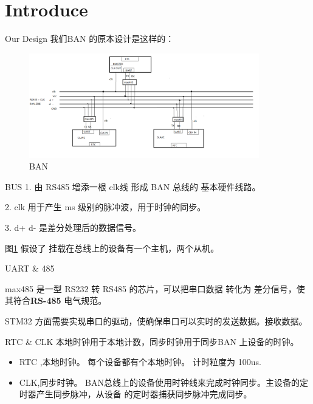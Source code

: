 \section{Introduce}

\begin{frame}[fragile]{Our Design}
我们BAN 的原本设计是这样的：
\begin{figure}[htbp]
\begin{center}
\includegraphics[width=10cm]{img/overview}
\caption{BAN }
\label{Overview}
\end{center}
\vspace{-0.5em}
\end{figure}
\end{frame}


\begin{frame}[fragile]{BUS}
1. 由 RS485 增添一根 clk线 形成 BAN 总线的 基本硬件线路。

2. clk 用于产生 ms 级别的脉冲波，用于时钟的同步。

3.  d+ d- 是差分处理后的数据信号。

图\ref{Overview} 假设了 挂载在总线上的设备有一个主机，两个从机。

\end{frame}

\begin{frame}[fragile]{UART \& 485}

max485 是一型 RS232 转 RS485 的芯片，可以把串口数据 转化为 差分信号，使其符合\textbf{RS-485}
电气规范。

STM32 方面需要实现串口的驱动，使确保串口可以实时的发送数据。接收数据。

\end{frame}

\begin{frame}[fragile]{RTC \& CLK}
本地时钟用于本地计数，同步时钟用于同步BAN 上设备的时钟。
\begin{itemize}
\item  RTC ,本地时钟。 每个设备都有个本地时钟。 计时粒度为 100us.

\item  CLK,同步时钟。 BAN总线上的设备使用时钟线来完成时钟同步。主设备的定时器产生同步脉冲，从设备
的定时器捕获同步脉冲完成同步。
\end{itemize}


\end{frame}


